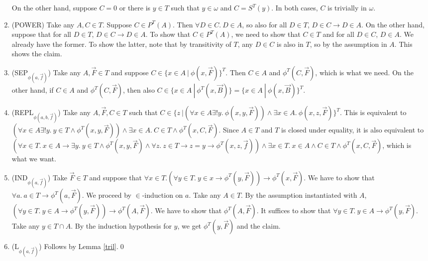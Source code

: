 \documentclass{LMCS}
\begin{document}
\begin{enumerate}[$\bullet$]
On the other hand, suppose $C = 0$ or there is $y \in T$ such that $y \in
\omega$ and $C = S^T(y)$. In both cases, $C$ is trivially in $\omega$. 
\item (POWER) Take any $A, C \in T$. Suppose $C \in P^T(A)$. Then $\forall D
\in C.\ D \in A$, so also for all $D \in T$, $D \in C \to D \in A$. On the other hand,
suppose that for all $D \in T$, $D \in C \to D \in A$.  
To show that $C \in P^T(A)$, we need to show that $C \in T$ and for all $D \in C$, $D \in
A$. We already have the former. To show the latter, note that by
transitivity of $T$, any $D \in C$ is also in $T$, so by the assumption in
$A$. This shows the claim.
\item (SEP${}_{\phi(a, \vec{f})}$) Take any $A, \vec{F} \in T$ and suppose $C \in \{ x \in A\ |\ \phi(x,
\vec{F}) \}^T$. Then $C \in A$ and $\phi^T(C, \vec{F})$, which is what we need. 
On the other hand, if $C \in A$ and $\phi^T(C, \vec{F})$, then
also $C \in \{ x \in A\ |\ \phi^T(x, \vec{B}) \}= \{ x \in A\ |\ \phi(x, \vec{B}) \}^T$.
\item (REPL${}_{\phi(a, b, \vec{f})}$) Take any $A, \vec{F}, C \in T$ such that
$C \in \{ z\ | (\forall x \in A \exists! y.\ \phi(x, y, \vec{F})) \land 
\exists x \in A.\ \phi(x, z, \vec{F}) \}^T$. This is equivalent to 
$(\forall x \in A \exists! y.\ y \in T \land \phi^T(x, y, \vec{F})) 
\land \exists x \in A.\ C \in T \land \phi^T(x, C, \vec{F})$.
Since $A \in T$ and $T$ is closed under equality, it is also equivalent to $(\forall x \in T.\ x \in A \to
\exists y.\ y \in T \land \phi^T(x, y, \vec{F}) \land \forall z.\ z  \in T \to
z = y \to \phi^T(x, z, \vec{f})) \land \exists x \in T.\ x \in A \land C \in
T \land \phi^T(x, C, \vec{F})$, which is what we want. 
\item (IND${}_{\phi(a, \vec{f})}$) Take $\vec{F} \in T$ and suppose that $\forall x \in T. 
(\forall y \in T.\ y \in x \to \phi^T(y, \vec{F})) \to \phi^T(x, \vec{F})$. We have to
show that $\forall a.\ a \in T \to \phi^T(a, \vec{F})$.
We proceed by $\in$-induction on $a$. Take any $A \in T$. By the assumption
instantiated with $A$, $(\forall y \in T.\ y \in A \to \phi^T(y, \vec{F}))
\to \phi^T(A, \vec{F})$. We have to show that $\phi^T(A, \vec{F})$. It suffices to show 
that $\forall y \in T.\ y \in A \to \phi^T(y, \vec{F})$. Take any $y \in T
\cap A$. By the induction hypothesis for $y$, we get $\phi^T(y, \vec{F})$ and
the claim.
\item (L${}_{\phi(a, \vec{f})}$) Follows by Lemma \ref{tril}.\qed
\end{enumerate}
\end{document}

